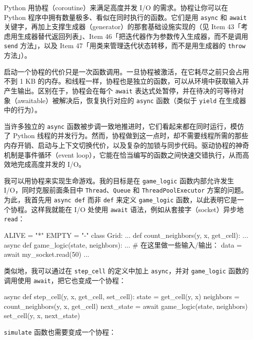 Python 用协程（coroutine）来满足高度并发 I/O 的需求。协程让你可以在 Python 程序中拥有数量极多、看似在同时执行的函数。它们是用 \texttt{async} 和 \texttt{await} 关键字，再加上支撑生成器（generator）的那套基础设施实现的（见 Item 43「考虑用生成器替代返回列表」、Item 46「把迭代器作为参数传入生成器，而不是调用 \texttt{send} 方法」，以及 Item 47「用类来管理迭代状态转移，而不是用生成器的 \texttt{throw} 方法」）。

启动一个协程的代价只是一次函数调用。一旦协程被激活，在它耗尽之前只会占用不到 1 KB 的内存。和线程一样，协程也是独立的函数，可以从环境中获取输入并产生输出。区别在于，协程会在每个 \texttt{await} 表达式处暂停，并在待决的可等待对象（awaitable）被解决后，恢复执行对应的 \texttt{async} 函数（类似于 \texttt{yield} 在生成器中的行为）。

当许多独立的 \texttt{async} 函数被步调一致地推进时，它们看起来都在同时运行，模仿了 Python 线程的并发行为。然而，协程做到这一点时，却不需要线程所需的那些内存开销、启动与上下文切换代价，以及复杂的加锁与同步代码。驱动协程的神奇机制是事件循环（event loop），它能在恰当编写的函数之间快速交错执行，从而高效地完成高度并发的 I/O。

我可以用协程来实现生命游戏。我的目标是在 \texttt{game\_logic} 函数内部允许发生 I/O，同时克服前面条目中 \texttt{Thread}、\texttt{Queue} 和 \texttt{ThreadPoolExecutor} 方案的问题。为此，我首先用 \texttt{async def} 而非 \texttt{def} 来定义 \texttt{game\_logic} 函数，以此表明它是一个协程。这样我就能在 I/O 处使用 \texttt{await} 语法，例如从套接字（socket）异步地 \texttt{read}：

\begin{codebox}[python]
ALIVE = "*"
EMPTY = "-"
class Grid:
    ...
def count_neighbors(y, x, get_cell):
    ...
async def game_logic(state, neighbors):
    ...
    # 在这里做一些输入/输出：
    data = await my_socket.read(50)
    ...
\end{codebox}

类似地，我可以通过在 \texttt{step\_cell} 的定义中加上 \texttt{async}，并对 \texttt{game\_logic} 函数的调用使用 \texttt{await}，把它也变成一个协程：

\begin{codebox}[python]
async def step_cell(y, x, get_cell, set_cell):
    state = get_cell(y, x)
    neighbors = count_neighbors(y, x, get_cell)
    next_state = await game_logic(state, neighbors)
    set_cell(y, x, next_state)
\end{codebox}

\texttt{simulate} 函数也需要变成一个协程：

